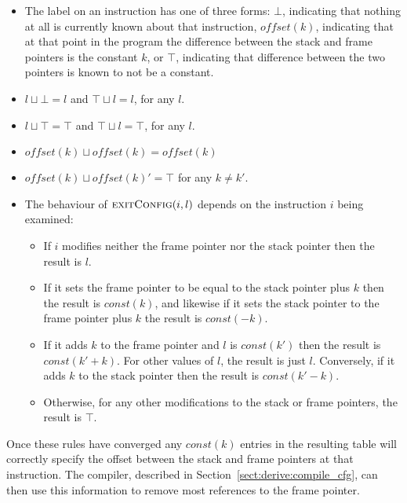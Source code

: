 \begin{itemize}
\item
  The label on an instruction has one of three forms: $\bot$,
  indicating that nothing at all is currently known about that
  instruction, $offset(k)$, indicating that at that point in the
  program the difference between the stack and frame pointers is the
  constant $k$, or $\top$, indicating that difference between the two
  pointers is known to not be a constant.
\item
  $l \sqcup \bot = l$ and $\top \sqcup l = l$, for any $l$.
\item
  $l \sqcup \top = \top$ and $\top \sqcup l = \top$, for any $l$.
\item
  $offset(k) \sqcup \mathit{offset}(k) = \mathit{offset}(k)$
\item
  $offset(k) \sqcup \mathit{offset}(k)' = \top$ for any $k \not= k'$.
\item
  The behaviour of $\textsc{exitConfig}(i, l)$ depends on the
  instruction $i$ being examined:

  \begin{itemize}
  \item If $i$ modifies neither the frame pointer nor the stack
    pointer then the result is $l$.
  \item If it sets the frame pointer to be equal to the stack pointer
    plus $k$ then the result is $\mathit{const}(k)$, and likewise if
    it sets the stack pointer to the frame pointer plus $k$ the result
    is $\mathit{const}(-k)$.
  \item If it adds $k$ to the frame pointer and $l$ is
    $\mathit{const}(k')$ then the result is $\mathit{const}(k'+k)$.
    For other values of $l$, the result is just $l$.  Conversely, if
    it adds $k$ to the stack pointer then the result is
    $\mathit{const}(k'-k)$.
  \item Otherwise, for any other modifications to the stack or frame
    pointers, the result is $\top$.
  \end{itemize}
\end{itemize}

Once these rules have converged any $\mathit{const}(k)$ entries in the
resulting table will correctly specify the offset between the stack
and frame pointers at that instruction.  The {\StateMachine} compiler,
described in Section~\ref{sect:derive:compile_cfg}, can then use this
information to remove most references to the frame pointer.


